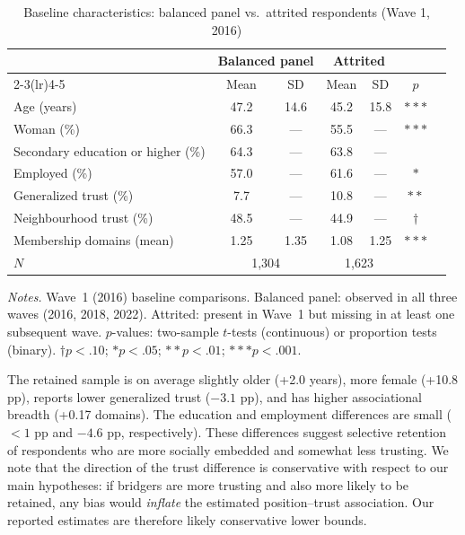 \documentclass[12pt, a4paper]{article}
\newcommand{\tablenote}[1]{\vspace{4pt}\par\footnotesize\textit{Notes.} #1}
\begin{document}
\begin{table}[H]
\centering
\caption{Baseline characteristics: balanced panel vs.\ attrited respondents (Wave 1, 2016)}
\label{tab:A1_attrition}
\small
\begin{tabular}{lcccccc}
\hline\hline
  & \multicolumn{2}{c}{Balanced panel} & \multicolumn{2}{c}{Attrited} & \\
  \cmidrule(lr){2-3}\cmidrule(lr){4-5}
  & Mean & SD & Mean & SD & $p$ \\
\hline
  Age (years)                          & 47.2 & 14.6 & 45.2 & 15.8 & $***$ \\
  Woman (\%)                           & 66.3 & ---  & 55.5 & ---  & $***$ \\
  Secondary education or higher (\%)   & 64.3 & ---  & 63.8 & ---  &       \\
  Employed (\%)                        & 57.0 & ---  & 61.6 & ---  & $*$   \\
  Generalized trust (\%)               &  7.7 & ---  & 10.8 & ---  & $**$  \\
  Neighbourhood trust (\%)             & 48.5 & ---  & 44.9 & ---  & $\dagger$ \\
  Membership domains (mean)            &  1.25 & 1.35 & 1.08 & 1.25 & $***$ \\
\hline
  $N$ & \multicolumn{2}{c}{1,304} & \multicolumn{2}{c}{1,623} & \\
\hline\hline
\end{tabular}
\tablenote{Wave~1 (2016) baseline comparisons. Balanced panel: observed in all
three waves (2016, 2018, 2022). Attrited: present in Wave~1 but missing in at
least one subsequent wave. $p$-values: two-sample $t$-tests (continuous) or
proportion tests (binary).
$\dagger p<.10$; $* p<.05$; $** p<.01$; $*** p<.001$.}
\end{table}

The retained sample is on average slightly older (+2.0 years), more
female (+10.8 pp), reports lower generalized trust ($-3.1$ pp), and has
higher associational breadth (+0.17 domains). The education and employment
differences are small ($<1$ pp and $-4.6$ pp, respectively). These
differences suggest selective retention of respondents who are more socially
embedded and somewhat less trusting. We note that the direction of the trust
difference is conservative with respect to our main hypotheses: if bridgers
are more trusting and also more likely to be retained, any bias would
\emph{inflate} the estimated position--trust association. Our reported
estimates are therefore likely conservative lower bounds.
\end{document}
